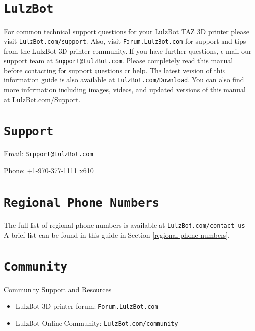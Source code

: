 %
%
%
%
%

\section{\texttt{LulzBot}}
\setlength{\parindent}{0pt}
For common technical support questions for your LulzBot\textsuperscript{\miniscule{\textregistered}} TAZ 3D printer please visit \texttt{LulzBot.com/support}. Also, visit \texttt{Forum.LulzBot.com} for support and tips from the LulzBot 3D printer community. If you have further questions, e-mail our support team at \texttt{Support@LulzBot.com}. Please completely read this manual before contacting for support questions or help. The latest version of this information guide is also available at \texttt{LulzBot.com/Download}. You can also find more information including images, videos, and updated versions of this manual at LulzBot.com/Support.

\section{\texttt{Support}}
\setlength{\parindent}{0pt}
Email: \texttt{Support@LulzBot.com}

Phone: +1-970-377-1111 x610

\section{\texttt{Regional Phone Numbers}}
The full list of regional phone numbers is available at \texttt{LulzBot.com/contact-us} A brief list can be found in this guide in Section \ref{regional-phone-numbers}.

\section{\texttt{Community}}
Community Support and Resources

\begin{itemize}

\item LulzBot 3D printer forum: \texttt{Forum.LulzBot.com}
\item LulzBot Online Community: \texttt{LulzBot.com/community}

\end{itemize}
